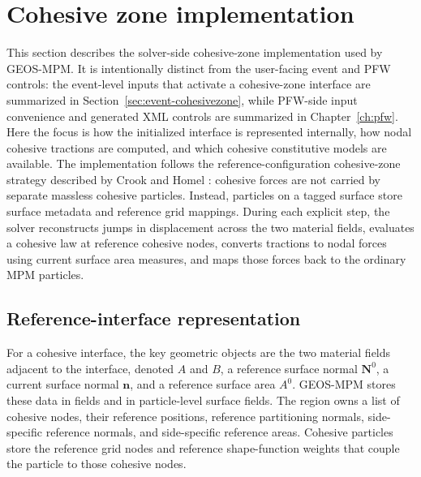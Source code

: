 \section{Cohesive zone implementation}
\label{sec:cz-implementation}
\label{sec:cohesive-zone-implementation}

This section describes the solver-side cohesive-zone implementation used by GEOS-MPM.  It is intentionally distinct from the user-facing event and PFW controls: the event-level inputs that activate a cohesive-zone interface are summarized in Section~\ref{sec:event-cohesivezone}, while PFW-side input convenience and generated XML controls are summarized in Chapter~\ref{ch:pfw}.  Here the focus is how the initialized interface is represented internally, how nodal cohesive tractions are computed, and which cohesive constitutive models are available.  The implementation follows the reference-configuration cohesive-zone strategy described by Crook and Homel \cite{crook2025cohesive}: cohesive forces are not carried by separate massless cohesive particles.  Instead, particles on a tagged surface store surface metadata and reference grid mappings.  During each explicit step, the solver reconstructs jumps in displacement across the two material fields, evaluates a cohesive law at reference cohesive nodes, converts tractions to nodal forces using current surface area measures, and maps those forces back to the ordinary MPM particles.

\subsection{Reference-interface representation}

For a cohesive interface, the key geometric objects are the two material fields adjacent to the interface, denoted $A$ and $B$, a reference surface normal $\mathbf{N}^0$, a current surface normal $\mathbf{n}$, and a reference surface area $A^0$.  GEOS-MPM stores these data in  fields and in particle-level surface fields.  The region owns a list of cohesive nodes, their reference positions, reference partitioning normals, side-specific reference normals, and side-specific reference areas.  Cohesive particles store the reference grid nodes and reference shape-function weights that couple the particle to those cohesive nodes.

